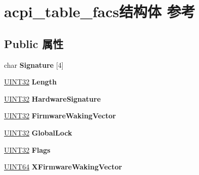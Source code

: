 \hypertarget{structacpi__table__facs}{}\section{acpi\+\_\+table\+\_\+facs结构体 参考}
\label{structacpi__table__facs}
\subsection*{Public 属性}
\begin{DoxyCompactItemize}
\item 
\mbox{\label{structacpi__table__facs_a1b0c71b1e9c5649dd8f666beecef4eb7}} 
char {\bfseries Signature} \mbox{[}4\mbox{]}
\item 
\mbox{\label{structacpi__table__facs_a17eda77a48a955d352921a62f354cb34}} 
\hyperlink{_processor_bind_8h_ae1e6edbbc26d6fbc71a90190d0266018}{U\+I\+N\+T32} {\bfseries Length}
\item 
\mbox{\label{structacpi__table__facs_a47a1ef980e60e4642e10eedc4cede65e}} 
\hyperlink{_processor_bind_8h_ae1e6edbbc26d6fbc71a90190d0266018}{U\+I\+N\+T32} {\bfseries Hardware\+Signature}
\item 
\mbox{\label{structacpi__table__facs_a4fff79a07b193504409305346ee168d2}} 
\hyperlink{_processor_bind_8h_ae1e6edbbc26d6fbc71a90190d0266018}{U\+I\+N\+T32} {\bfseries Firmware\+Waking\+Vector}
\item 
\mbox{\label{structacpi__table__facs_afcab79da616e2483ff9f1cd240729128}} 
\hyperlink{_processor_bind_8h_ae1e6edbbc26d6fbc71a90190d0266018}{U\+I\+N\+T32} {\bfseries Global\+Lock}
\item 
\mbox{\label{structacpi__table__facs_aebe204f51ff3b13351421921e3326b0b}} 
\hyperlink{_processor_bind_8h_ae1e6edbbc26d6fbc71a90190d0266018}{U\+I\+N\+T32} {\bfseries Flags}
\item 
\mbox{\label{structacpi__table__facs_ab055215c67df90d96db90d68067f3e92}} 
\hyperlink{_processor_bind_8h_a57be03562867144161c1bfee95ca8f7c}{U\+I\+N\+T64} {\bfseries X\+Firmware\+Waking\+Vector}

\end{DoxyCompactItemize}
